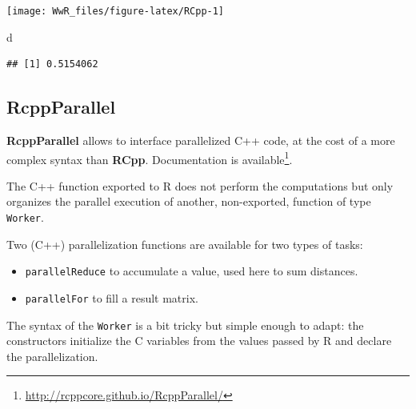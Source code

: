 \documentclass[
  12pt,
  american,
  a4paper,
  extrafontsizes,onecolumn,openright
  ]{memoir}
\newenvironment{Shaded}{\begin{snugshade}}{\end{snugshade}}
\newcommand{\NormalTok}[1]{#1}
\providecommand{\tightlist}{%
  \setlength{\itemsep}{0pt}\setlength{\parskip}{0pt}}
\newlength{\rf}
\begin{document}
\begin{center}\texttt{[image: WwR\_files/figure-latex/RCpp-1]} \end{center}

\begin{Shaded}
\begin{Highlighting}[]
\NormalTok{d}
\end{Highlighting}
\end{Shaded}

\begin{verbatim}
## [1] 0.5154062
\end{verbatim}

\normalsize

\hypertarget{rcppparallel}{%
\subsection{RcppParallel}\label{rcppparallel}}

\textbf{RcppParallel} allows to interface parallelized C++ code, at the cost of a more complex syntax than \textbf{RCpp}.
Documentation is available\footnote{\url{http://rcppcore.github.io/RcppParallel/}}.

The C++ function exported to R does not perform the computations but only organizes the parallel execution of another, non-exported, function of type \texttt{Worker}.

Two (C++) parallelization functions are available for two types of tasks:

\begin{itemize}
\tightlist
\item
  \texttt{parallelReduce} to accumulate a value, used here to sum distances.
\item
  \texttt{parallelFor} to fill a result matrix.
\end{itemize}

The syntax of the \texttt{Worker} is a bit tricky but simple enough to adapt: the constructors initialize the C variables from the values passed by R and declare the parallelization.

\scriptsize
\end{document}
